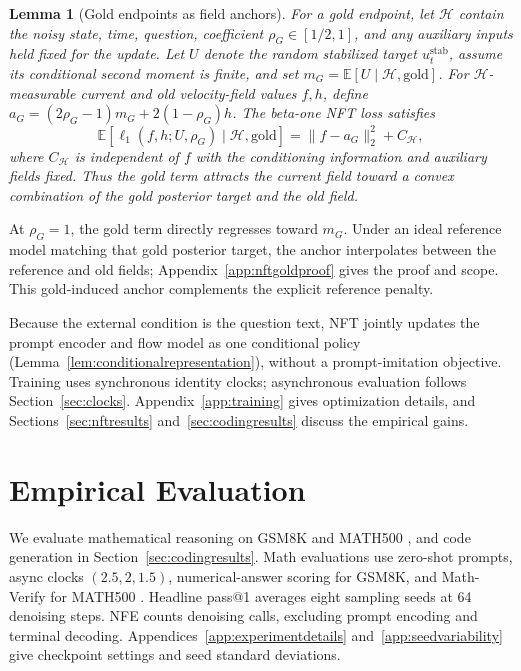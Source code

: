 \documentclass{article}
\newcommand{\E}{\mathbb{E}}
\newtheorem{lemma}{Lemma}
\begin{document}
\begin{lemma}[Gold endpoints as field anchors]
\label{lem:goldanchor}
For a gold endpoint, let $\mathcal H$ contain the noisy state, time, question, coefficient $\rho_G\in[1/2,1]$, and any auxiliary inputs held fixed for the update. Let $U$ denote the random stabilized target $u_t^{\mathrm{stab}}$, assume its conditional second moment is finite, and set $m_G=\E[U\mid\mathcal H,\mathrm{gold}]$. For $\mathcal H$-measurable current and old velocity-field values $f,h$, define $a_G=(2\rho_G-1)m_G+2(1-\rho_G)h$. The beta-one NFT loss satisfies
\begin{equation}
 \E[\ell_1(f,h;U,\rho_G)\mid\mathcal H,\mathrm{gold}]
 =\|f-a_G\|_2^2+C_{\mathcal H},
\label{eq:nftgoldanchor}
\end{equation}
where $C_{\mathcal H}$ is independent of $f$ with the conditioning information and auxiliary fields fixed. Thus the gold term attracts the current field toward a convex combination of the gold posterior target and the old field.
\end{lemma}

At $\rho_G=1$, the gold term directly regresses toward $m_G$. Under an ideal reference model matching that gold posterior target, the anchor interpolates between the reference and old fields; Appendix~\ref{app:nftgoldproof} gives the proof and scope. This gold-induced anchor complements the explicit reference penalty.

Because the external condition is the question text, NFT jointly updates the prompt encoder and flow model as one conditional policy (Lemma~\ref{lem:conditionalrepresentation}), without a prompt-imitation objective. Training uses synchronous identity clocks; asynchronous evaluation follows Section~\ref{sec:clocks}. Appendix~\ref{app:training} gives optimization details, and Sections~\ref{sec:nftresults} and~\ref{sec:codingresults} discuss the empirical gains.

\section{Empirical Evaluation}
\label{sec:headlineresults}

We evaluate mathematical reasoning on GSM8K and MATH500 \citep{gsm8k,math,math500}, and code generation in Section~\ref{sec:codingresults}. Math evaluations use zero-shot prompts, async clocks $(2.5,2,1.5)$, numerical-answer scoring for GSM8K, and Math-Verify for MATH500 \citep{mathverify}. Headline pass@1 averages eight sampling seeds at 64 denoising steps. NFE counts denoising calls, excluding prompt encoding and terminal decoding. Appendices~\ref{app:experimentdetails} and~\ref{app:seedvariability} give checkpoint settings and seed standard deviations.
\end{document}
